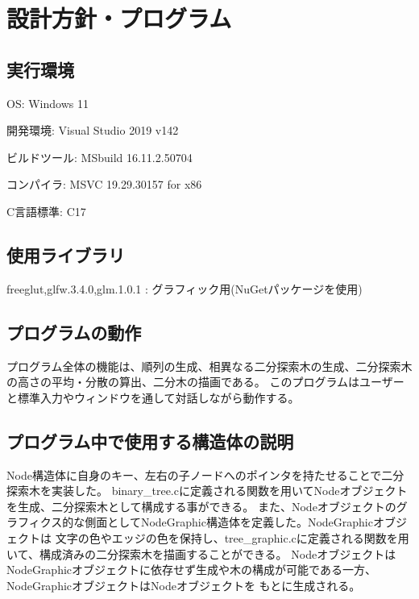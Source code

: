 \documentclass{ltjsarticle}
\title{}
\author{62304644 片山さくら}
\begin{document}
\maketitle

\section{設計方針・プログラム}


\subsection{実行環境}
\begin{list}{}{\leftmargin=1em}
  \item OS: Windows 11
  \item 開発環境: Visual Studio 2019 v142
  \item ビルドツール: MSbuild 16.11.2.50704
  \item コンパイラ: MSVC 19.29.30157 for x86
  \item C言語標準: C17
\end{list}

\subsection{使用ライブラリ}
\begin{list}{}{\leftmargin=1em}
  \item freeglut,glfw.3.4.0,glm.1.0.1 : グラフィック用(NuGetパッケージを使用)
\end{list}

\subsection{プログラムの動作}

プログラム全体の機能は、順列の生成、相異なる二分探索木の生成、二分探索木の高さの平均・分散の算出、二分木の描画である。
このプログラムはユーザーと標準入力やウィンドウを通して対話しながら動作する。

\subsection{プログラム中で使用する構造体の説明}

Node構造体に自身のキー、左右の子ノードへのポインタを持たせることで二分探索木を実装した。
binary\_tree.cに定義される関数を用いてNodeオブジェクトを生成、二分探索木として構成する事ができる。
また、Nodeオブジェクトのグラフィクス的な側面としてNodeGraphic構造体を定義した。NodeGraphicオブジェクトは
文字の色やエッジの色を保持し、tree\_graphic.cに定義される関数を用いて、構成済みの二分探索木を描画することができる。
NodeオブジェクトはNodeGraphicオブジェクトに依存せず生成や木の構成が可能である一方、NodeGraphicオブジェクトはNodeオブジェクトを
もとに生成される。
\end{document}
